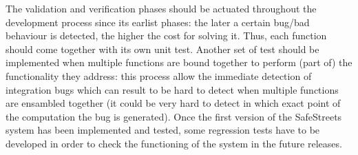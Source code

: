 The validation and verification phases should be actuated throughout the development process since its earlist phases: the later a certain bug/bad behaviour is detected, the higher the cost for solving it. Thus, each function should come together with its own unit test.\newline
Another set of test should be implemented when multiple functions are bound together to perform (part of) the functionality they address: this process allow the immediate detection of integration bugs which can result to be hard to detect when multiple functions are ensambled together (it could be very hard to detect in which exact point of the computation the bug is generated).
Once the first version of the SafeStreets system has been implemented and tested, some regression tests have to be developed in order to check the functioning of the system in the future releases.
